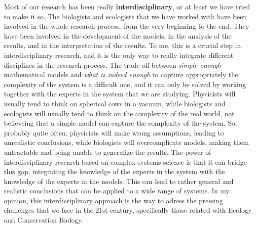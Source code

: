 Most of our research has been really \textbf{interdisciplinary}, or at least
we have tried to make it so. The biologists and ecologists that we have worked
with have been involved in the whole research process, from the very beginning
to the end. They have been involved in the development of the models, in the
analysis of the results, and in the interpretation of the results. To me, this
is a crucial step in interdisciplinary research, and it is the only way to
really integrate different disciplines in the research process. The trade-off
between \textit{simple enough} mathematical models and \textit{what is indeed
    enough} to capture appropriately the complexity of the system is a
difficult one, and it can only be solved by working together with the experts
in the system that we are studying. Physicists will usually tend to think on
spherical cows in a vacuum, while biologists and ecologists will usually tend
to think on the complexity of the real world, not believeing that a simple
model can capture the complexity of the system. So, probably quite often,
physicists will make wrong assumptions, leading to unrealistic conclusions,
while biologists will overcomplicate models, making them untractable and being
unable to generalize the results. The power of interdisciplinary research based
on complex systems science is that it can bridge this gap, integrating the
knowledge of the experts in the system with the knowledge of the experts in the
models. This can lead to rather general and realistic conclusions that can be
applied to a wide range of systems. In my opinion, this interdicsiplinary
approach is the way to adress the pressing challenges that we face in the 21st
century, specifically those related with Ecology and Conservation Biology.



